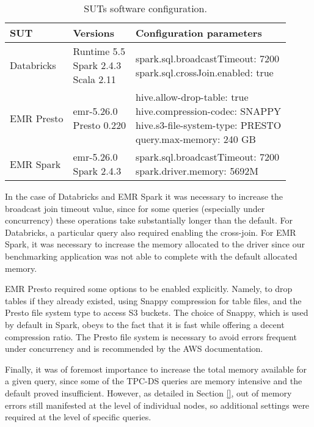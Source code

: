 \begin{table}
  \centering
	\begin{tabular}{|l|l|l|}
	  \hline
		\textbf{SUT} & \textbf{Versions} & \textbf{Configuration parameters} \\ \hline
		Databricks & \makecell[l]{Runtime 5.5 \\ Spark 2.4.3 \\ Scala 2.11} & \makecell[l]{spark.sql.broadcastTimeout: 7200 \\ spark.sql.crossJoin.enabled: true} \\ \hline
		EMR Presto & \makecell[l]{emr-5.26.0 \\ Presto 0.220} & \makecell[l]{hive.allow-drop-table: true \\ hive.compression-codec: SNAPPY \\ hive.s3-file-system-type: PRESTO \\ query.max-memory: 240 GB} \\ \hline
		EMR Spark & \makecell[l]{emr-5.26.0 \\ Spark 2.4.3} & \makecell[l]{spark.sql.broadcastTimeout: 7200 \\ spark.driver.memory: 5692M} \\ \hline 
	\end{tabular}
	\caption{SUTs software configuration.}
	\label{table:softwareConf}
\end{table}

In the case of Databricks and EMR Spark it was necessary to increase the broadcast join timeout value, since for some queries (especially under concurrency) these operations take substantially longer than the default. For Databricks, a particular query also required enabling the cross-join. For EMR Spark, it was necessary to increase the memory allocated to the driver since our benchmarking application was not able to complete with the default allocated memory.

EMR Presto required some options to be enabled explicitly. Namely, to drop tables if they already existed, using Snappy compression for table files, and the Presto file system type to access S3 buckets. The choice of Snappy, which is used by default in Spark, obeys to the fact that it is fast while offering a decent compression ratio. The Presto file system is necessary to avoid errors frequent under concurrency and is recommended by the AWS documentation.

Finally, it was of foremost importance to increase the total memory available for a given query, since some of the TPC-DS queries are memory intensive and the default proved insufficient. However, as detailed in Section \ref{}, out of memory errors still manifested at the level of individual nodes, so additional settings were required at the level of specific queries.



